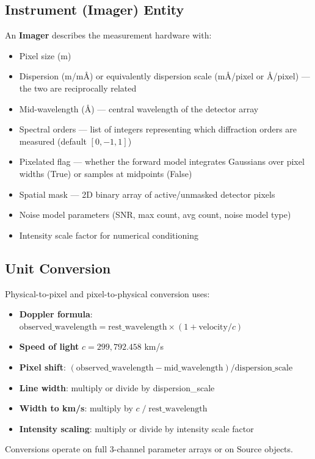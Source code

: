 \documentclass[11pt,a4paper]{article}
\begin{document}
\subsection{Instrument (Imager) Entity}
An \textbf{Imager} describes the measurement hardware with:
\begin{itemize}[nosep]
  \item Pixel size (\textmu m)
  \item Dispersion (\textmu m/m\AA) or equivalently dispersion scale (m\AA/pixel or \AA/pixel) --- the two are reciprocally related
  \item Mid-wavelength (\AA) --- central wavelength of the detector array
  \item Spectral orders --- list of integers representing which diffraction orders are measured (default $[0, -1, 1]$)
  \item Pixelated flag --- whether the forward model integrates Gaussians over pixel widths (True) or samples at midpoints (False)
  \item Spatial mask --- 2D binary array of active/unmasked detector pixels
  \item Noise model parameters (SNR, max count, avg count, noise model type)
  \item Intensity scale factor for numerical conditioning
\end{itemize}

\subsection{Unit Conversion}
Physical-to-pixel and pixel-to-physical conversion uses:
\begin{itemize}[nosep]
  \item \textbf{Doppler formula}: $\text{observed\_wavelength} = \text{rest\_wavelength} \times (1 + \text{velocity} / c)$
  \item \textbf{Speed of light} $c = 299{,}792.458$ km/s
  \item \textbf{Pixel shift}: $(\text{observed\_wavelength} - \text{mid\_wavelength}) / \text{dispersion\_scale}$
  \item \textbf{Line width}: multiply or divide by dispersion\_scale
  \item \textbf{Width to km/s}: multiply by $c\;/\;\text{rest\_wavelength}$
  \item \textbf{Intensity scaling}: multiply or divide by intensity scale factor
\end{itemize}
Conversions operate on full 3-channel parameter arrays or on Source objects.
\end{document}
